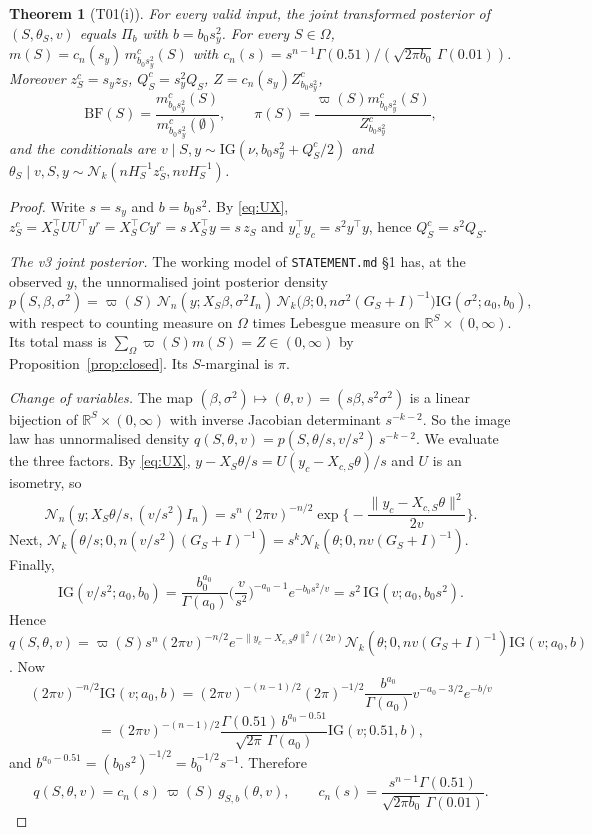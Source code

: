 \documentclass[11pt]{article}
\newtheorem{theorem}{Theorem}[section]
\theoremstyle{remark}
\newcommand{\R}{\mathbb R}
\newcommand{\IG}{\mathrm{IG}}
\newcommand{\N}{\mathcal N}
\newcommand{\tr}{^{\top}}
\newcommand{\vp}{\varpi}
\newcommand{\Om}{\Omega}
\newcommand{\sy}{s_y}
\newcommand{\yc}{y_c}
\begin{document}
\begin{theorem}[T01(i)]\label{thm:T01i}
For every valid input, the joint transformed posterior of $(S,\theta_S,v)$ equals $\Pi_{b}$ with $b=b_0\sy^2$. For every $S\in\Om$, $m(S)=c_n(\sy)\,m^c_{b_0\sy^2}(S)$ with $c_n(s)=s^{n-1}\Gamma(0.51)/(\sqrt{2\pi b_0}\,\Gamma(0.01))$. Moreover $z^c_S=\sy z_S$, $Q^c_S=\sy^2Q_S$, $Z=c_n(\sy)Z^c_{b_0\sy^2}$,
\[
\mathrm{BF}(S)=\frac{m^c_{b_0\sy^2}(S)}{m^c_{b_0\sy^2}(\emptyset)},\qquad \pi(S)=\frac{\vp(S)m^c_{b_0\sy^2}(S)}{Z^c_{b_0\sy^2}},
\]
and the conditionals are $v\mid S,y\sim\IG(\nu,b_0\sy^2+Q^c_S/2)$ and $\theta_S\mid v,S,y\sim\N_k(nH_S^{-1}z^c_S,nvH_S^{-1})$.
\end{theorem}
\begin{proof}
Write $s=\sy$ and $b=b_0s^2$. By \eqref{eq:UX}, $z^c_S=X_S\tr UU\tr y^r=X_S\tr Cy^r=s\,X_S\tr y=s\,z_S$ and $\yc\tr\yc=s^2y\tr y$, hence $Q^c_S=s^2Q_S$.

\emph{The v3 joint posterior.} The working model of \texttt{STATEMENT.md} \S1 has, at the observed $y$, the unnormalised joint posterior density
\[
p(S,\beta,\sigma^2)=\vp(S)\,\N_n(y;X_S\beta,\sigma^2I_n)\,\N_k\big(\beta;0,n\sigma^2(G_S+I)^{-1}\big)\IG(\sigma^2;a_0,b_0),
\]
with respect to counting measure on $\Om$ times Lebesgue measure on $\R^S\times(0,\infty)$. Its total mass is $\sum_\Om\vp(S)m(S)=Z\in(0,\infty)$ by Proposition~\ref{prop:closed}. Its $S$-marginal is $\pi$.

\emph{Change of variables.} The map $(\beta,\sigma^2)\mapsto(\theta,v)=(s\beta,s^2\sigma^2)$ is a linear bijection of $\R^S\times(0,\infty)$ with inverse Jacobian determinant $s^{-k-2}$. So the image law has unnormalised density $q(S,\theta,v)=p(S,\theta/s,v/s^2)\,s^{-k-2}$. We evaluate the three factors. By \eqref{eq:UX}, $y-X_S\theta/s=U(\yc-X_{c,S}\theta)/s$ and $U$ is an isometry, so
\[
\N_n(y;X_S\theta/s,(v/s^2)I_n)=s^{n}(2\pi v)^{-n/2}\exp\Big\{-\frac{\|\yc-X_{c,S}\theta\|^2}{2v}\Big\}.
\]
Next, $\N_k(\theta/s;0,n(v/s^2)(G_S+I)^{-1})=s^k\N_k(\theta;0,nv(G_S+I)^{-1})$. Finally,
\[
\IG(v/s^2;a_0,b_0)=\frac{b_0^{a_0}}{\Gamma(a_0)}\Big(\frac v{s^2}\Big)^{-a_0-1}e^{-b_0s^2/v}=s^2\,\IG(v;a_0,b_0s^2).
\]
Hence $q(S,\theta,v)=\vp(S)s^n(2\pi v)^{-n/2}e^{-\|\yc-X_{c,S}\theta\|^2/(2v)}\N_k(\theta;0,nv(G_S+I)^{-1})\IG(v;a_0,b)$. Now
\[
(2\pi v)^{-n/2}\IG(v;a_0,b)=(2\pi v)^{-(n-1)/2}(2\pi)^{-1/2}\frac{b^{a_0}}{\Gamma(a_0)}v^{-a_0-3/2}e^{-b/v}
\]\[
=(2\pi v)^{-(n-1)/2}\frac{\Gamma(0.51)\,b^{a_0-0.51}}{\sqrt{2\pi}\,\Gamma(a_0)}\IG(v;0.51,b),
\]
and $b^{a_0-0.51}=(b_0s^2)^{-1/2}=b_0^{-1/2}s^{-1}$. Therefore
\begin{equation}\label{eq:q}
q(S,\theta,v)=c_n(s)\,\vp(S)\,g_{S,b}(\theta,v),\qquad c_n(s)=\frac{s^{n-1}\Gamma(0.51)}{\sqrt{2\pi b_0}\,\Gamma(0.01)} .
\end{equation}


\end{proof}
\end{document}
